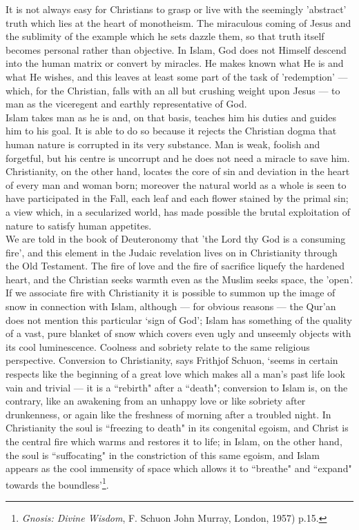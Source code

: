 \documentclass[10pt, twoside,openright]{book}
\begin{document}
It is not always easy for Christians to grasp or live with the seemingly 'abstract' truth which lies 
at the heart of monotheism. The miraculous coming of Jesus and the sublimity of the example which he 
sets dazzle them, so that truth itself becomes personal rather than objective. In Islam, God does not 
Himself descend into the human matrix or convert by miracles. He makes known what He is and what He 
wishes, and this leaves at least some part of the task of 'redemption' --- which, for the Christian, 
falls with an all but crushing weight upon Jesus --- to man as the viceregent and earthly 
representative of God. \\

Islam takes man as he is and, on that basis, teaches him his duties and guides him to his goal. It is 
able to do so because it rejects the Christian dogma that human nature is corrupted in its very 
substance. Man is weak, foolish and forgetful, but his centre is uncorrupt and he does not need a 
miracle to save him. Christianity, on the other hand, locates the core of sin and deviation in the 
heart of every man and woman born; moreover the natural world as a whole is seen to have participated 
in the Fall, each leaf and each flower stained by the primal sin; a view which, in a secularized 
world, has made possible the brutal exploitation of nature to satisfy human appetites. \\

We are told in the book of Deuteronomy that 'the Lord thy God is a consuming fire', and this element 
in the Judaic revelation lives on in Christianity through the Old Testament. The fire of love and the 
fire of sacrifice liquefy the hardened heart, and the Christian seeks warmth even as the Muslim seeks 
space, the 'open'. If we associate fire with Christianity it is possible to summon up the image of 
snow in connection with Islam, although --- for obvious reasons --- the Qur'an does not mention this 
particular `sign of God'; Islam has something of the quality of a vast, pure blanket of snow which 
covers even ugly and unseemly objects with its cool luminescence. Coolness and sobriety relate to the 
same religious perspective. Conversion to Christianity, says Frithjof Schuon, `seems in certain 
respects like the beginning of a great love which makes all a man's past life look vain and trivial --- 
it is a ``rebirth" after a ``death"; conversion to Islam is, on the contrary, like an awakening from an 
unhappy love or like sobriety after drunkenness, or again like the freshness of morning after a 
troubled night. In Christianity the soul is ``freezing to death" in its congenital egoism, and Christ 
is the central fire which warms and restores it to life; in Islam, on the other hand, the soul is 
``suffocating" in the constriction of this same egoism, and Islam appears as the cool immensity of 
space which allows it to ``breathe" and ``expand" towards the boundless'\footnote{\emph{Gnosis: Divine Wisdom}, F. Schuon John Murray, London, 1957) p.15.}. \\
\end{document}
